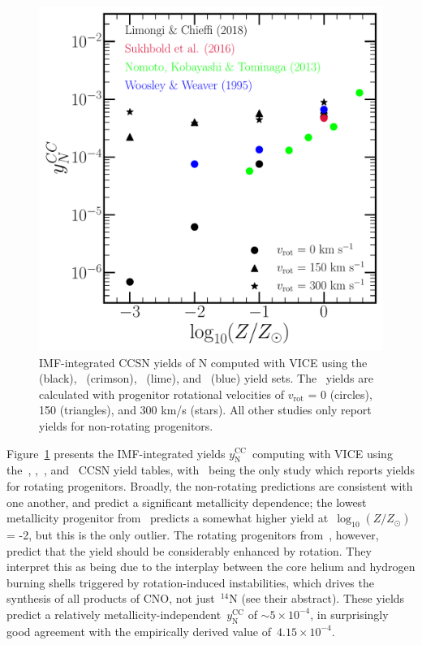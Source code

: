 \documentclass[12pt]{report}
\begin{document}
\begin{figure}[!t] 
\centering 
\includegraphics[scale = 0.7]{n_cc_yields.pdf} 
\caption{IMF-integrated CCSN yields of N computed with VICE using the 
\citet{Limongi2018} (black),~\citet{Sukhbold2016} (crimson),~\citet{Nomoto2013} 
(lime), and~\citet{Woosley1995} (blue) yield sets. The~\citet{Limongi2018} 
yields are calculated with progenitor rotational velocities of 
$v_\text{rot}$ = 0 (circles), 150 (triangles), and 300 km/s (stars). All other 
studies only report yields for non-rotating progenitors. } 
\label{fig:n_cc_yields} 
\end{figure} 

\noindent 
Figure~\ref{fig:n_cc_yields} presents the IMF-integrated yields 
$y_\text{N}^\text{CC}$~computing with VICE using the~\citet{Limongi2018}, 
\citet{Sukhbold2016},~\citet{Nomoto2013}, and~\citet{Woosley1995} CCSN yield 
tables, with~\citet{Limongi2018} being the only study which reports yields for 
rotating progenitors. Broadly, the non-rotating predictions are consistent with 
one another, and predict a significant metallicity dependence; the lowest 
metallicity progenitor from~\citet{Woosley1995} predicts a somewhat higher 
yield at~$\log_{10}(Z/Z_\odot)$ = -2, but this is the only outlier. The 
rotating progenitors from~\citet{Limongi2018}, however, predict that the 
yield should be considerably enhanced by rotation. They interpret this as being 
due to the interplay between the core helium and hydrogen burning shells 
triggered by rotation-induced instabilities, which drives the synthesis of all 
products of CNO, not just~$^{14}$N (see their abstract). These yields predict a 
relatively metallicity-independent~$y_\text{N}^\text{CC}$ of 
$\sim5\times10^{-4}$, in surprisingly good agreement with the empirically 
derived value of~$4.15\times10^{-4}$. 
\end{document}
